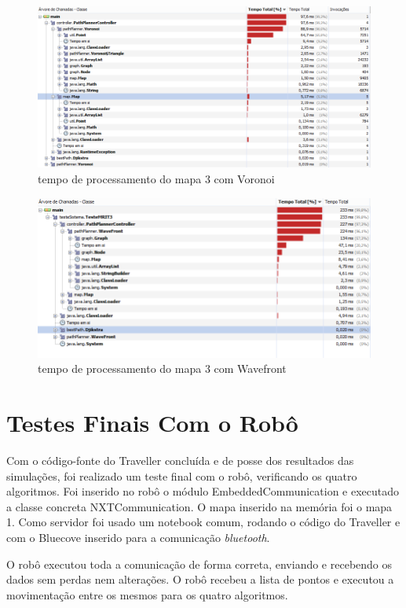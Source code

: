 \begin{figure}[H]
	\centering
	\label{fig49}
		\includegraphics[keepaspectratio=true,scale=0.6]{figuras/voronoi3.PNG}
	\caption{tempo de processamento do mapa 3 com Voronoi}
\end{figure}

\begin{figure}[H]
	\centering
	\label{fig50}
		\includegraphics[keepaspectratio=true,scale=0.6]{figuras/wave3.PNG}
	\caption{tempo de processamento do mapa 3 com Wavefront}
\end{figure}

\section{Testes Finais Com o Robô}

Com o código-fonte do Traveller concluída e de posse dos resultados das simulações, foi realizado um teste final com o robô, verificando os quatro algoritmos. Foi inserido no robô o módulo EmbeddedCommunication e executado a classe concreta NXTCommunication. O mapa inserido na memória foi o mapa 1. Como servidor foi usado um notebook comum, rodando o código do Traveller e com o Bluecove inserido para a comunicação \textit{bluetooth}. 

O robô executou toda a comunicação de forma correta, enviando e recebendo os dados sem perdas nem alterações. O robô recebeu a lista de pontos e executou a movimentação entre os mesmos para os quatro algoritmos.

